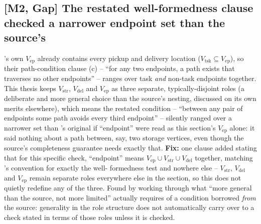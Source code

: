 \documentclass[11pt]{article}
\begin{document}
\subsection*{[M2, Gap] The restated well-formedness clause checked a narrower endpoint set than the source's}
\citeauthor{ma2017lifelong}'s own $V_{\mathrm{ep}}$ already contains every
pickup and delivery location ($V_{\mathrm{tsk}} \subseteq V_{\mathrm{ep}}$),
so their path-condition clause (c) -- ``for any two endpoints, a path exists
that traverses no other endpoints'' -- ranges over task \emph{and} non-task
endpoints together. This thesis keeps $V_{\mathrm{str}}$, $V_{\mathrm{del}}$
and $V_{\mathrm{ep}}$ as three separate, typically-disjoint roles (a
deliberate and more general choice than the source's nesting, discussed on
its own merits elsewhere), which means the restated condition -- ``between
any pair of endpoints some path avoids every third endpoint'' -- silently
ranged over a narrower set than \citeauthor{ma2017lifelong}'s original if
``endpoint'' were read as this section's $V_{\mathrm{ep}}$ alone: it said
nothing about a path between, say, two storage vertices, even though the
source's completeness guarantee needs exactly that. \textbf{Fix:} one clause
added stating that for this specific check, ``endpoint'' means
$V_{\mathrm{ep}} \cup V_{\mathrm{str}} \cup V_{\mathrm{del}}$ together,
matching \citeauthor{ma2017lifelong}'s convention for exactly the well-
formedness test and nowhere else -- $V_{\mathrm{str}}$, $V_{\mathrm{del}}$
and $V_{\mathrm{ep}}$ remain separate roles everywhere else in the section,
so this does not quietly redefine any of the three. Found by working through
what ``more general than the source, not more limited'' actually requires
of a condition borrowed \emph{from} the source: generality in the role
structure does not automatically carry over to a check stated in terms of
those roles unless it is checked.
\end{document}
